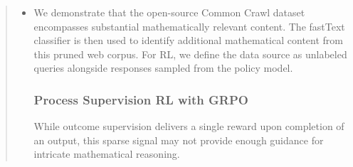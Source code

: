 \begin{abstract}
\begin{itemize}[topsep=0pt]
\begin{itemize}[topsep=0pt]
    \item We demonstrate that the open-source Common Crawl dataset encompasses substantial mathematically relevant content. The fastText classifier is then used to identify additional mathematical content from this pruned web corpus. For RL, we define the data source as unlabeled queries alongside responses sampled from the policy model. \subsubsection{Process Supervision RL with GRPO} While outcome supervision delivers a single reward upon completion of an output, this sparse signal may not provide enough guidance for intricate mathematical reasoning. \end{itemize}


\end{itemize}
\end{abstract}

